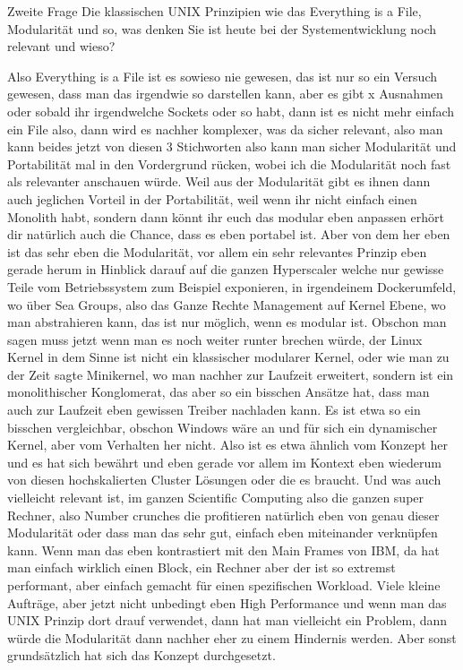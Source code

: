 \begin{description}
\DS Zweite Frage \glqq Die klassischen UNIX Prinzipien wie das Everything is a File, Modularität und so, was denken Sie ist heute bei der Systementwicklung noch relevant und wieso?\grqq

\NH Also Everything is a File ist es sowieso nie gewesen, das ist nur so ein Versuch gewesen, dass man das irgendwie so darstellen kann, aber es gibt x Ausnahmen oder sobald ihr irgendwelche Sockets oder so habt, dann ist es nicht mehr einfach ein File also, dann wird es nachher komplexer, was da sicher relevant, also man kann beides jetzt von diesen 3 Stichworten also kann man sicher Modularität und Portabilität mal in den Vordergrund rücken, wobei ich die Modularität noch fast als relevanter anschauen würde. Weil aus der Modularität gibt es ihnen dann auch jeglichen Vorteil in der Portabilität, weil wenn ihr nicht einfach einen Monolith habt, sondern dann könnt ihr euch das modular eben anpassen erhört dir natürlich auch die Chance, dass es eben portabel ist. Aber von dem her eben ist das sehr eben die Modularität, vor allem ein sehr relevantes Prinzip eben gerade herum in Hinblick darauf auf die ganzen Hyperscaler welche nur gewisse Teile vom Betriebssystem zum Beispiel exponieren, in irgendeinem Dockerumfeld, wo über Sea Groups, also das Ganze Rechte Management auf Kernel Ebene, wo man abstrahieren kann, das ist nur möglich, wenn es modular ist. Obschon man sagen muss jetzt wenn man es noch weiter runter brechen würde, der Linux Kernel in dem Sinne ist nicht ein klassischer modularer Kernel, oder wie man zu der Zeit sagte Minikernel, wo man nachher zur Laufzeit erweitert, sondern ist ein monolithischer Konglomerat, das aber so ein bisschen Ansätze hat, dass man auch zur Laufzeit eben gewissen Treiber nachladen kann. Es ist etwa so ein bisschen vergleichbar, obschon Windows wäre an und für sich ein dynamischer Kernel, aber vom Verhalten her nicht. Also ist es etwa ähnlich vom Konzept her und es hat sich bewährt und eben gerade vor allem im Kontext eben wiederum von diesen hochskalierten Cluster Lösungen oder die es braucht. Und was auch vielleicht relevant ist, im ganzen Scientific Computing also die ganzen super Rechner, also Number crunches die profitieren natürlich eben von genau dieser Modularität oder dass man das sehr gut, einfach eben miteinander verknüpfen kann. Wenn man das eben kontrastiert mit den Main Frames von IBM, da hat man einfach wirklich einen Block, ein Rechner aber der ist so extremst performant, aber einfach gemacht für einen spezifischen Workload. Viele kleine Aufträge, aber jetzt nicht unbedingt eben High Performance und wenn man das UNIX Prinzip dort drauf verwendet, dann hat man vielleicht ein Problem, dann würde die Modularität dann nachher eher zu einem Hindernis werden. Aber sonst grundsätzlich hat sich das Konzept durchgesetzt.
	

\end{description}
